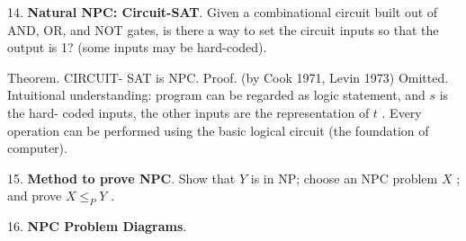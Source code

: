 \documentclass[10pt,a4paper]{article}
\begin{document}
14. \textbf{Natural NPC: Circuit-SAT}. Given a combinational circuit built out of AND, OR, and NOT gates, is there a way to set the circuit inputs so that the output is 1? (some inputs may be hard-coded).
\begin{center}
\end{center}
Theorem. CIRCUIT- SAT is NPC.
Proof. (by Cook 1971, Levin 1973) Omitted.
Intuitional understanding: program can be regarded as logic statement, and \(s\) is the hard- coded inputs, the other inputs are the representation of \(t\) . Every operation can be performed using the basic logical circuit (the foundation of computer).

15. \textbf{Method to prove NPC}. Show that \(Y\) is in NP; choose an NPC problem \(X\) ; and prove \(X \leq_{P} Y\) .

16. \textbf{NPC Problem Diagrams}.
\begin{center}
\end{center}
\end{document}
